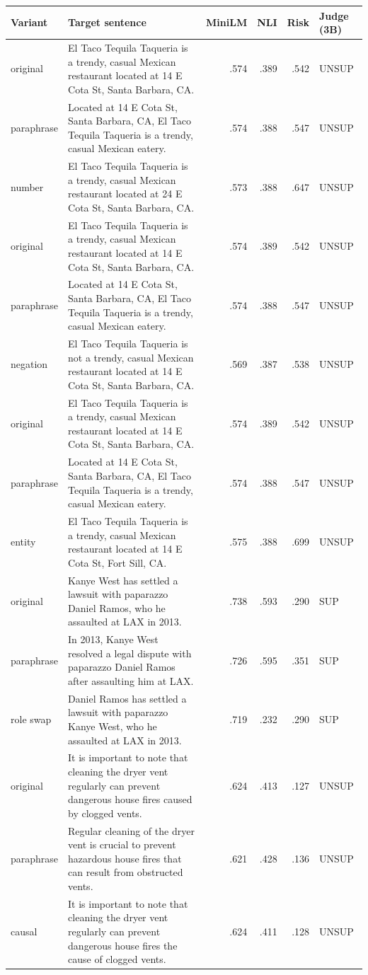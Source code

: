 \begin{tabular}{p{}p{}rrrl}
\toprule
Variant & Target sentence & MiniLM & NLI & Risk & Judge (3B) \\
\midrule
original & El Taco Tequila Taqueria is a trendy, casual Mexican restaurant located at 14 E Cota St, Santa Barbara, CA. & .574 & .389 & .542 & UNSUP \\
paraphrase & Located at 14 E Cota St, Santa Barbara, CA, El Taco Tequila Taqueria is a trendy, casual Mexican eatery. & .574 & .388 & .547 & UNSUP \\
number & El Taco Tequila Taqueria is a trendy, casual Mexican restaurant located at 24 E Cota St, Santa Barbara, CA. & .573 & .388 & .647 & UNSUP \\
\midrule
original & El Taco Tequila Taqueria is a trendy, casual Mexican restaurant located at 14 E Cota St, Santa Barbara, CA. & .574 & .389 & .542 & UNSUP \\
paraphrase & Located at 14 E Cota St, Santa Barbara, CA, El Taco Tequila Taqueria is a trendy, casual Mexican eatery. & .574 & .388 & .547 & UNSUP \\
negation & El Taco Tequila Taqueria is not a trendy, casual Mexican restaurant located at 14 E Cota St, Santa Barbara, CA. & .569 & .387 & .538 & UNSUP \\
\midrule
original & El Taco Tequila Taqueria is a trendy, casual Mexican restaurant located at 14 E Cota St, Santa Barbara, CA. & .574 & .389 & .542 & UNSUP \\
paraphrase & Located at 14 E Cota St, Santa Barbara, CA, El Taco Tequila Taqueria is a trendy, casual Mexican eatery. & .574 & .388 & .547 & UNSUP \\
entity & El Taco Tequila Taqueria is a trendy, casual Mexican restaurant located at 14 E Cota St, Fort Sill, CA. & .575 & .388 & .699 & UNSUP \\
\midrule
original & Kanye West has settled a lawsuit with paparazzo Daniel Ramos, who he assaulted at LAX in 2013. & .738 & .593 & .290 & SUP \\
paraphrase & In 2013, Kanye West resolved a legal dispute with paparazzo Daniel Ramos after assaulting him at LAX. & .726 & .595 & .351 & SUP \\
role swap & Daniel Ramos has settled a lawsuit with paparazzo Kanye West, who he assaulted at LAX in 2013. & .719 & .232 & .290 & SUP \\
\midrule
original & It is important to note that cleaning the dryer vent regularly can prevent dangerous house fires caused by clogged vents. & .624 & .413 & .127 & UNSUP \\
paraphrase & Regular cleaning of the dryer vent is crucial to prevent hazardous house fires that can result from obstructed vents. & .621 & .428 & .136 & UNSUP \\
causal & It is important to note that cleaning the dryer vent regularly can prevent dangerous house fires the cause of clogged vents. & .624 & .411 & .128 & UNSUP \\
\bottomrule
\end{tabular}
